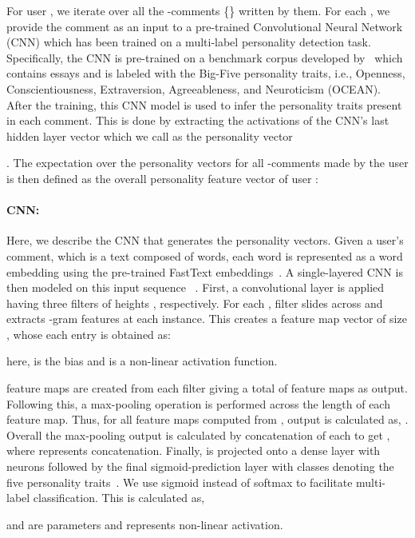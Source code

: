 \documentclass[11pt]{article}
\begin{document}
For user , we iterate over all the -comments \{\} written by them. For each , we provide the comment as an input to a pre-trained Convolutional Neural Network (CNN) which has been trained on a multi-label personality detection task. Specifically, the CNN is pre-trained on a benchmark corpus developed by~ which contains  essays and is labeled with the Big-Five personality traits, i.e., Openness, Conscientiousness, Extraversion, Agreeableness, and Neuroticism (OCEAN). After the training, this CNN model is used to infer the personality traits present in each comment. This is done by extracting the activations of the CNN's last hidden layer vector which we call as the personality vector {. The expectation over the personality vectors for all -comments made by the user is then defined as the overall personality feature vector  of user :

\paragraph{CNN:}
Here, we describe the CNN that generates the personality vectors. Given a user's comment, which is a text  composed of  words, each word  is represented as a word embedding   using the pre-trained FastText embeddings~\cite{bojanowski2016enriching}. A single-layered CNN is then modeled on this input sequence ~\cite{kim2014convolutional}. First, a convolutional layer is applied having three filters  of heights , respectively. For each , filter  slides across  and extracts -gram features at each instance.  This creates a feature map vector  of size , whose each entry  is obtained as:

here,  is the bias and  is a non-linear activation function.

 feature maps are created from each filter  giving a total of  feature maps as output. Following this, a max-pooling operation is performed across the length of each feature map. Thus, for all  feature maps computed from , output  is calculated as, . Overall the max-pooling output is calculated by concatenation of each  to get  , where  represents concatenation. Finally,  is projected onto a dense layer with  neurons followed by the final sigmoid-prediction layer with  classes denoting the five personality traits~\cite{matthews2003personality}. We use sigmoid instead of softmax to facilitate multi-label classification. This is calculated as,

 and  are parameters and  represents non-linear activation.

}
\end{document}
